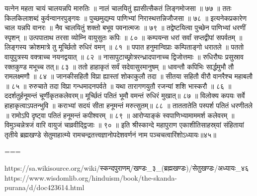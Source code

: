 यत्नेन महता चायं चालयन्नपि मारुतिः ॥
नालं चालयितुं ह्यासीत्सैकतं लिङ्गमोजसा ॥ ७७ ॥
ततः किलकिलाशब्दं कुर्वन्वानरपुङ्गवः ॥
पुच्छमुद्यम्य पाणिभ्यां निरास्थत्तन्निजौजसा ॥ ७८ ॥
इत्यनेकप्रकारेण चाल यन्नपि वानरः ॥
नैव चालयितुं शक्तो बभूव पवनात्मजः ॥ ७९ ॥
तद्वेष्टयित्वा पुच्छेन पाणिभ्यां धरणीं स्पृशन् ॥
उत्पपाताथ तरसा व्योम्नि वायुसुतः कपिः ॥ ८० ॥
कम्पयन्स धरां सर्वां सप्तद्वीपां सपर्वतम् ॥
लिङ्गस्य क्रोशमात्रे तु मूर्च्छितो रुधिरं वमन् ॥ ८१ ॥
पपात हनुमान्विप्राः कम्पिताङ्गो धरातले ॥
पततो वायुपुत्रस्य वक्त्राच्च नयनद्वयात् ॥ ८२ ॥
नासापुटाच्छ्रोत्ररन्ध्रादपानाच्च द्विजोत्तमाः ॥
रुधिरौघः प्रसुस्राव रक्तकुण्ड मभूच्च तत्॥ ८३ ॥
ततो हाहाकृतं सर्वं सदेवासुरमानुषम् ॥
धावन्तौ कपिभिः सार्द्धमुभौ तौ रामलक्ष्मणौ ॥ ८४ ॥
जानकीसहितौ विप्रा ह्यास्तां शोकाकुलौ तदा ॥
सीतया सहितौ वीरौ वानरैश्च महाबलौ ॥ ८५ ॥
रुरुचाते तदा विप्रा गन्धमादनपर्वते ॥
यथा तारागणयुतौ रजन्यां शशि भास्करौ ॥ ८६ ॥
ददर्शतुर्हनूमन्तं चूर्णीकृतकलेवरम्॥
मूर्च्छितं पतितं भूमौ वमन्तं रुधिरं मुखात्॥ ८७ ॥
विलोक्य कपयः सर्वे हाहाकृत्वाऽपतन्भुवि ॥
कराभ्यां सदयं सीता हनूमन्तं मरुत्सुतम्॥ ८८ ॥
ताततातेति पस्पर्श पतितं धरणीतले ॥
रामोऽपि दृष्ट्वा पतितं हनूमन्तं कपीश्वरम् ॥ ८९ ॥
आरोप्याङ्कं स्वपाणिभ्यामाममर्श कलेवरम् ॥
विमुञ्चन्नेत्रजं वारि वायुजं चाव्रवीद्द्विजाः ॥ ९० ॥
इति श्रीस्कान्दे महापुराण एकाशीतिसाहस्र्यां संहितायां तृतीये ब्रह्मखण्डे सेतुमाहात्म्ये रामचन्द्रतत्त्वज्ञानोपदेशवर्णनं नाम पञ्चचत्वारिंशोऽध्यायः॥४५॥


===

https://sa.wikisource.org/wiki/स्कन्दपुराणम्/खण्डः_३_(ब्रह्मखण्डः)/सेतुखण्डः/अध्यायः_४६
https://www.wisdomlib.org/hinduism/book/the-skanda-purana/d/doc423614.html


